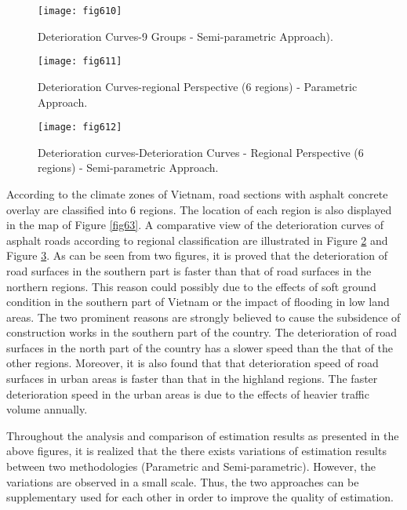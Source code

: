 \begin{figure}[t]
\begin{center}
\texttt{[image: fig610]}
\end{center}
\caption{Deterioration Curves-9 Groups - Semi-parametric Approach).}
\label{fig610}
\end{figure}
\begin{figure}[t]
\begin{center}
\texttt{[image: fig611]}
\end{center}
\caption{Deterioration Curves-regional Perspective (6 regions) - Parametric  Approach.}
\label{fig611}
\end{figure}
\begin{figure}[t]
\begin{center}
\texttt{[image: fig612]}
\end{center}
\caption{Deterioration curves-Deterioration Curves - Regional Perspective (6 regions) - Semi-parametric Approach.}
\label{fig612}
\end{figure}

According to the climate zones of Vietnam, road sections with asphalt concrete overlay are classified into $6$ regions. The location of each region is also displayed in the map of Figure \ref{fig63}. A comparative view of the deterioration curves of asphalt roads according to regional classification are illustrated in Figure \ref{fig611} and Figure \ref{fig612}. As can be seen from two figures, it is proved that the deterioration of road surfaces in the southern part is faster than that of road surfaces in the northern regions. This reason could possibly due to the effects of soft ground condition in the southern part of Vietnam or the impact of flooding in low land areas. The two prominent reasons are strongly believed to cause the subsidence of construction works in the southern part of the country. The deterioration of road surfaces in the north part of the country has a slower speed than the that of the other regions. Moreover, it is also found that that deterioration speed of road surfaces in urban areas is faster than that in the highland regions. The faster deterioration speed in the urban areas is due to the effects of heavier traffic volume annually.

Throughout the analysis and comparison of estimation results as presented in the above figures, it is realized that the there exists variations of estimation results between two methodologies (Parametric and Semi-parametric). However, the variations are observed in a small scale. Thus, the two approaches can be supplementary used for each other in order to improve the quality of estimation.
%
